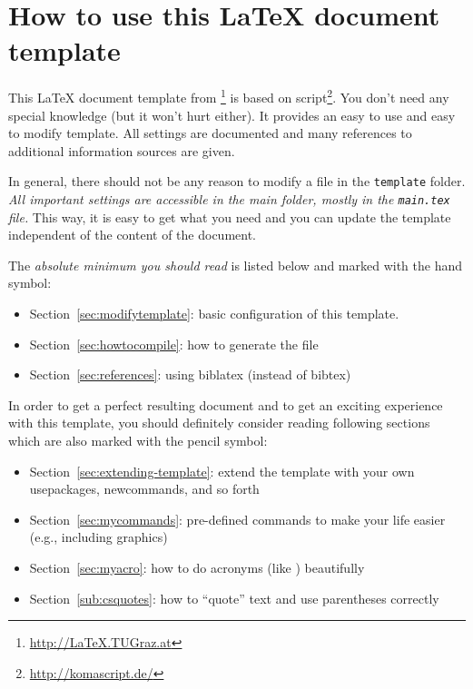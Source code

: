 \usepackage{dingbat,bbding}
\usepackage{eurosym}
\newcommand{\myimportant}{%
  \marginpar{\vspace{-1em}\rightpointleft}
}
\newcommand{\myinteresting}{\marginpar{\vspace{-2em}\PencilLeftDown}}





\section{How to use this \LaTeX{} document template}

This \LaTeX{} document template from
\THSmyLaT\footnote{\url{http://LaTeX.TUGraz.at}} is based on 
script\footnote{\url{http://komascript.de/}}. You don't need any
special  knowledge (but it won't hurt either). It provides an easy to use and
easy to modify template. All settings are documented and many references to
additional information sources are given.


In general, there should not be any reason to modify a file in
the \texttt{template} folder. \emph{All important settings are
accessible in the main folder, mostly in the \texttt{main.tex}
file.} This way, it is easy to get what you need and you can update
the template independent of the content of the document.




The \emph{absolute minimum you should read} is listed below and 
marked with the hand symbol:\myimportant
\begin{itemize}
\item Section~\ref{sec:modifytemplate}: basic configuration of this template.
\item Section~\ref{sec:howtocompile}: how to generate the  file
\item Section~\ref{sec:references}: using biblatex (instead of bibtex)
\end{itemize}

In order to get a perfect resulting document and to get an
exciting experience with this template, you should definitely consider reading
following sections which are also marked with the pencil symbol:\myinteresting
\begin{itemize}
\item Section~\ref{sec:extending-template}: extend the template with
  your own usepackages, newcommands, and so forth
\item Section~\ref{sec:mycommands}: pre-defined commands to make your life easier (e.g., including graphics)
\item Section~\ref{sec:myacro}: how to do acronyms (like ) beautifully
\item Section~\ref{sub:csquotes}: how to \enquote{quote} text and use parentheses correctly
\end{itemize}

